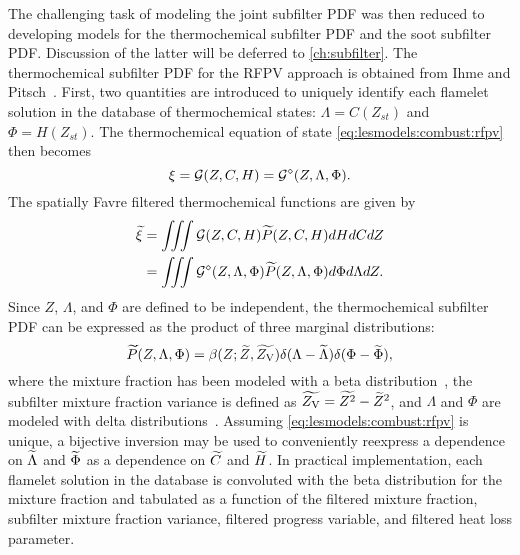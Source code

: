 The challenging task of modeling the joint subfilter PDF was then reduced to developing models for the thermochemical subfilter PDF and the soot subfilter PDF. Discussion of the latter will be deferred to \cref{ch:subfilter}. The thermochemical subfilter PDF for the RFPV approach is obtained from Ihme and Pitsch~\cite{ihme2008}. First, two quantities are introduced to uniquely identify each flamelet solution in the database of thermochemical states: $\Lambda = C(Z_{st})$ and $\Phi = H(Z_{st})$. The thermochemical equation of state \cref{eq:lesmodels:combust:rfpv} then becomes
\begin{equation}\label{eq:lesmodels:presumedpdf:eos}
  \xi = \mathcal{G}(Z, C, H) = \mathcal{G}^{\diamond}(Z, \Lambda, \Phi).
\end{equation}
The spatially Favre filtered thermochemical functions are given by
\begin{equation}\label{eq:lesmodels:presumedpdf:filteredeos}
  \begin{split}
    \widetilde{\xi} &= \iiint \mathcal{G}(Z,C,H)\widetilde{P}(Z,C,H) dHdCdZ \\
    &= \iiint \mathcal{G}^{\diamond}(Z,\Lambda,\Phi)\widetilde{P}(Z,\Lambda,\Phi) d\Phi d\Lambda dZ.
  \end{split}
\end{equation}
Since $Z$, $\Lambda$, and $\Phi$ are defined to be independent, the thermochemical subfilter PDF can be expressed as the product of three marginal distributions:
\begin{equation}\label{eq:lesmodels:presumedpdf:trimarg}
  \widetilde{P}(Z,\Lambda,\Phi) = \beta(Z;\widetilde{Z},\widetilde{Z_{\text{V}}})\delta(\Lambda - \widetilde{\Lambda})\delta(\Phi - \widetilde{\Phi}),
\end{equation}
where the mixture fraction has been modeled with a beta distribution~\cite{cook1994,jimenez1997,wall2000}, the subfilter mixture fraction variance is defined as $\widetilde{Z_{\text{V}}} = \widetilde{Z^2} - \widetilde{Z}^2$, and $\Lambda$ and $\Phi$ are modeled with delta distributions~\cite{ihme2008}. Assuming \cref{eq:lesmodels:combust:rfpv} is unique, a bijective inversion may be used to conveniently reexpress a dependence on $\widetilde{\Lambda}$ and $\widetilde{\Phi}$ as a dependence on $\widetilde{C}$ and $\widetilde{H}$. In practical implementation, each flamelet solution in the database is convoluted with the beta distribution for the mixture fraction and tabulated as a function of the filtered mixture fraction, subfilter mixture fraction variance, filtered progress variable, and filtered heat loss parameter.

